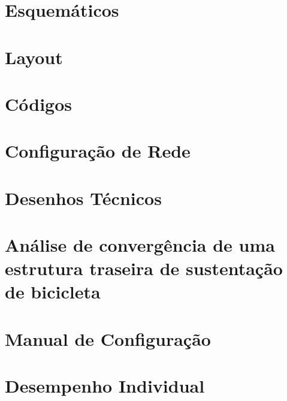 \begin{apendicesenv}
\chapter{Esquemáticos}


\chapter{Layout}


\chapter{Códigos}

\chapter{Configuração de Rede}



\chapter{Desenhos Técnicos}


\chapter{Análise de convergência de uma estrutura traseira de sustentação de bicicleta}


\chapter{Manual de Configuração}


\chapter{Desempenho Individual}


  
\end{apendicesenv}
